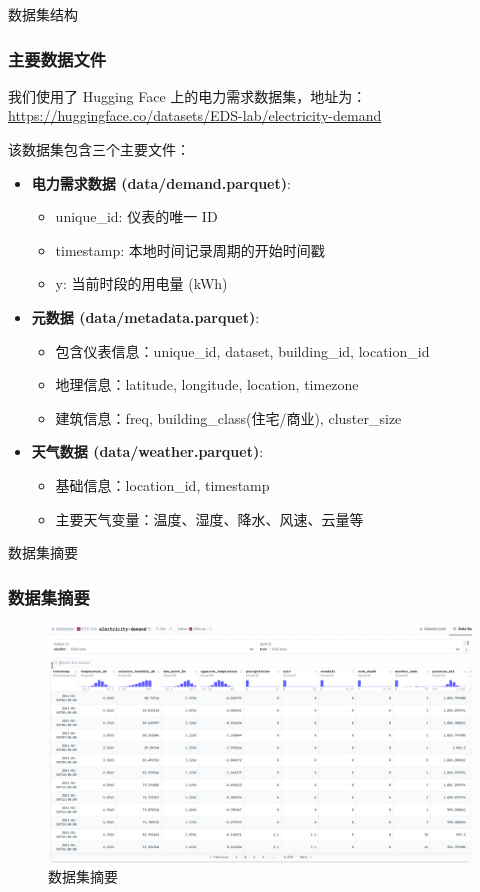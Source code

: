 \documentclass{beamer} %
\begin{document}
\begin{frame}{数据集结构}
    \frametitle{主要数据文件}
    我们使用了 Hugging Face 上的电力需求数据集，地址为：
    \href{https://huggingface.co/datasets/EDS-lab/electricity-demand}{https://huggingface.co/datasets/EDS-lab/electricity-demand}

    该数据集包含三个主要文件：
    \begin{itemize}
        \item \textbf{电力需求数据 (data/demand.parquet)}:
        \begin{itemize}
            \item unique\_id: 仪表的唯一 ID
            \item timestamp: 本地时间记录周期的开始时间戳
            \item y: 当前时段的用电量 (kWh)
        \end{itemize}
        \item \textbf{元数据 (data/metadata.parquet)}:
        \begin{itemize}
            \item 包含仪表信息：unique\_id, dataset, building\_id, location\_id
            \item 地理信息：latitude, longitude, location, timezone
            \item 建筑信息：freq, building\_class(住宅/商业), cluster\_size
        \end{itemize}
        \item \textbf{天气数据 (data/weather.parquet)}:
        \begin{itemize}
            \item 基础信息：location\_id, timestamp
            \item 主要天气变量：温度、湿度、降水、风速、云量等
        \end{itemize}
    \end{itemize}
\end{frame}

\begin{frame}{数据集摘要}
    \frametitle{数据集摘要}
    \begin{figure}[H]
        \centering
        \includegraphics[width=\textwidth]{./image.png}
        \caption{数据集摘要}
    \end{figure}
\end{frame}
\end{document}

